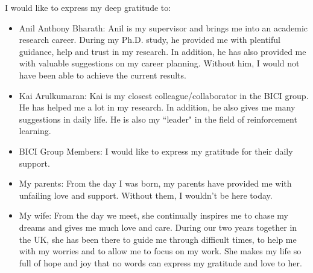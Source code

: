
\cleardoublepage


\begin{acknowledgements}

I would like to express my deep gratitude to:

\begin{itemize}
 \item Anil Anthony Bharath: Anil is my supervisor and brings me into an academic research career. During my Ph.D. study, he provided me with plentiful guidance, help and trust in my research. In addition, he has also provided me with valuable suggestions on my career planning. Without him, I would not have been able to achieve the current results.
 \vspace*{3mm}
 \item Kai Arulkumaran: Kai is my closest colleague/collaborator in the BICI group. He has helped me a lot in my research. In addition, he also gives me many suggestions in daily life. He is also my ``leader" in the field of reinforcement learning.
 \vspace*{3mm}
 \item BICI Group Members: I would like to express my gratitude for their daily support.
 \vspace*{3mm}
 \item My parents: From the day I was born, my parents have provided me with unfailing love and support. Without them, I wouldn't be here today.
 \vspace*{3mm}
 \item My wife: From the day we meet, she continually inspires me to chase my dreams and gives me much love and care. During our two years together in the UK, she has been there to guide me through difficult times, to help me with my worries and to allow me to focus on my work. She makes my life so full of hope and joy that no words can express my gratitude and love to her.
\end{itemize}

\end{acknowledgements}
